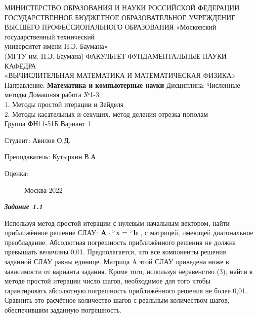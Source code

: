 \documentclass[12pt]{article}
\begin{document}
	
\begin{center}
	МИНИСТЕРСТВО ОБРАЗОВАНИЯ И НАУКИ РОССИЙСКОЙ ФЕДЕРАЦИИ \\ ГОСУДАРСТВЕННОЕ БЮДЖЕТНОЕ ОБРАЗОВАТЕЛЬНОЕ УЧРЕЖДЕНИЕ \\ 
	ВЫСШЕГО ПРОФЕССИОНАЛЬНОГО ОБРАЗОВАНИЯ
	\vskip 1.5cm
	«Московский государственный технический \\
	университет имени Н.Э. Баумана» \\
	(МГТУ им. Н.Э. Баумана)
	\vskip 1.5cm
	ФАКУЛЬТЕТ ФУНДАМЕНТАЛЬНЫЕ НАУКИ \\
	КАФЕДРА \\
	«ВЫЧИСЛИТЕЛЬНАЯ МАТЕМАТИКА И МАТЕМАТИЧЕСКАЯ ФИЗИКА»
	\vskip 0.4cm
	Направление: \textbf{Математика и компьютерные науки}
	\vskip 0.4cm
	Дисциплина: Численные методы
	\vskip 0.4cm
	Домашняя работа №1-3 \\
	1. Методы простой итерации и Зейделя \\
	2. Методы касательных и секущих, метод деления отрезка пополам \\
	Группа ФН11-51Б
	\vskip 0.2cm
	Вариант 1
	
	
	\vskip 1.5cm
	\begin{flushright}
		Студент: Авилов О.Д.
		
		\vskip 1.5cm
		
		Преподаватель: Кутыркин В.А
	\end{flushright}
	Оценка:
	
	\begin{figure}[b]
		\begin{center}
			Москва 2022
		\end{center}
	\end{figure}
	
\end{center}

\newpage

\begin{center}
	\textbf{\textit{Задание 1.1}}
\end{center}
Используя метод простой итерации с нулевым начальным вектором, найти приближённое
решение СЛАУ:
$	\mathbf{A \cdot {}^{\mathsmaller{>}} x = {}^\mathsmaller{>}b}$
, с матрицей, имеющей диагональное преобладание.
Абсолютная погрешность приближённого решения не должна превышать величины 0,01.
Предполагается, что все компоненты решения заданной СЛАУ равны единице. Матрица
A
этой СЛАУ приведена ниже в зависимости от варианта задания.
Кроме того, используя неравенство (3), найти в методе простой итерации число шагов,
необходимое для того чтобы гарантировать абсолютную погрешность приближённого
решения не более 0,01. Сравнить это расчётное количество шагов с реальным количеством
шагов, обеспечившим заданную погрешность.
\end{document}
